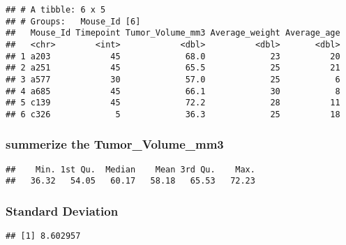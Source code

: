 \documentclass[
]{article}
\newenvironment{Shaded}{\begin{snugshade}}{\end{snugshade}}
\newcommand{\FunctionTok}[1]{\textcolor[rgb]{0.00,0.00,0.00}{#1}}
\newcommand{\NormalTok}[1]{#1}
\newcommand{\SpecialCharTok}[1]{\textcolor[rgb]{0.00,0.00,0.00}{#1}}
\begin{document}
\begin{verbatim}
## # A tibble: 6 x 5
## # Groups:   Mouse_Id [6]
##   Mouse_Id Timepoint Tumor_Volume_mm3 Average_weight Average_age
##   <chr>        <int>            <dbl>          <dbl>       <dbl>
## 1 a203            45             68.0             23          20
## 2 a251            45             65.5             25          21
## 3 a577            30             57.0             25           6
## 4 a685            45             66.1             30           8
## 5 c139            45             72.2             28          11
## 6 c326             5             36.3             25          18
\end{verbatim}

\hypertarget{summerize-the-tumor_volume_mm3-1}{%
\subsubsection{summerize the
Tumor\_Volume\_mm3}\label{summerize-the-tumor_volume_mm3-1}}

\begin{Shaded}
\end{Shaded}

\begin{verbatim}
##    Min. 1st Qu.  Median    Mean 3rd Qu.    Max. 
##   36.32   54.05   60.17   58.18   65.53   72.23
\end{verbatim}

\hypertarget{standard-deviation-1}{%
\subsubsection{Standard Deviation}\label{standard-deviation-1}}

\begin{Shaded}
\end{Shaded}

\begin{verbatim}
## [1] 8.602957
\end{verbatim}
\end{document}

